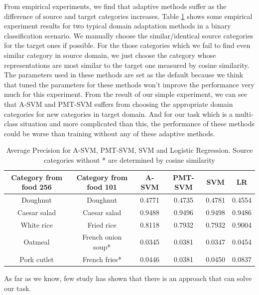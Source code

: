 From empirical experiments, we find that adaptive methods suffer as the difference of source and target categories increases. Table \ref{tab:su_domian} shows some empirical experiment results for two typical domain adaptation methods in a binary classification scenario. We manually choose the similar/identical source categories for the target ones if possible. For the those categories which we fail to find even similar category in source domain, we just choose the category whose representations are most similar to the target one measured by cosine similarity. The parameters used in these methods are set as the default because we think that tuned the parameters for these methods won't improve the performance very much for this experiment.  From the result of our simple experiment, we can see that A-SVM and PMT-SVM suffers from choosing the appropriate domain categories for new categories in target domain. And for our task which is a multi-class situation and more complicated than this, the performance of these methods could be worse than training without any of these adaptive methods.
\begin{table}[htbp]
  \centering
  \caption{Average Precision for A-SVM, PMT-SVM, SVM and Logistic Regression. Source categories without * are determined by cosine similarity}
    \begin{tabular}{cccccc}
    \toprule
    Category from food 256 & Category from food 101 & A-SVM  & PMT-SVM & SVM &LR\\
    \midrule
    Doughnut & Doughnut & 0.4771 & 0.4735 &0.4781&0.4554\\
    Caesar salad &  Caesar salad & 0.9488 & 0.9496 &0.9498&0.9486\\
    White rice  & Fried rice & 0.8118 & 0.7932 &0.7932&0.9004\\
    Oatmeal & French onion soup* & 0.0345 & 0.0381 & 0.0347 &0.0454\\
    Pork cutlet & French fries* & 0.0446 & 0.0381 &0.0450& 0.0837\\
    \bottomrule
    \end{tabular}%
  \label{tab:su_domian}%
\end{table}%

As far as we know, few study has shown that there is an approach that can solve our task.
